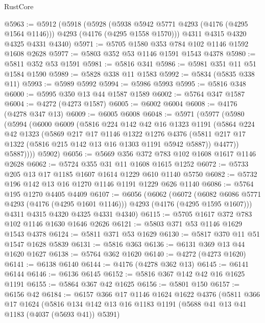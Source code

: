 \begin{lexlean}{RustCore}
\begin{coremodule}
@5963 := @5912
    (@5918
      (@5928
        (@5938 @5942 @5771 @4293 (@4176 (@4295 @1564 @1146)))
        @4293
        (@4176 (@4295 @1558 @1570)))
      @4311
      @4315
      @4320
      @4325
      @4331
      @4340)
@5971 := @5705 @1580 @353 @784 @102 @1146 @1592 @1608 @2628
@5977 := @5803 @352 @53 @1146 @1591 @1543 @4378
@5980 := @5811 @352 @53 @1591
@5981 := @5816 @341
@5986 := @5981 @351 @11 @51 @1584 @1590
@5989 := @5828 @338 @11 @1583
@5992 := @5834 (@5835 @338 @11)
@5993 := @5989 @5992
@5994 := @5986 @5993
@5995 := @5816 @348
@6000 := @5995 @350 @13 @44 @1587 @1589
@6002 := @5764 @347 @1587
@6004 := @4272 (@4273 @1587)
@6005 := @6002 @6004
@6008 := @4176 (@4278 @347 @13)
@6009 := @6005 @6008
@6048 := @5971
    (@5977
      (@5980
        (@5994
          (@6000
            @6009
            (@5816
              @224
              @142
              @42
              @16
              @1323
              @1191
              (@5864
                @224
                @42
                @1323
                (@5869
                  @217
                  @17
                  @1146
                  @1322
                  @1276
                  @4376
                  (@5811 @217 @17 @1322 (@5816 @215 @142 @13 @16 @1303 @1191 @5942 @5887))
                  @4477))
              @5887))))
      @5902)
@6056 := @5669 @356 @372 @783 @102 @1608 @1617 @1146 @2628
@6062 := @5724 @355 @31 @11 @1608 @1615 @1252
@6072 := @5733 @205 @13 @17 @1185 @1607 @1614 @1229 @610 @1140 @5750
@6082 := @5732 @196 @142 @13 @16 @1270 @1146 @1191 @1229 @626 @1140
@6086 := @5764 @195 @1270 @4405 @4409
@6107 := @6056
    (@6062
      (@6072
        (@6082 @6086 @5771 @4293 (@4176 (@4295 @1601 @1146)))
        @4293
        (@4176 (@4295 @1595 @1607)))
      @4311
      @4315
      @4320
      @4325
      @4331
      @4340)
@6115 := @5705 @1617 @372 @783 @102 @1146 @1630 @1646 @2626
@6121 := @5803 @371 @53 @1146 @1629 @1543 @4378
@6124 := @5811 @371 @53 @1629
@6130 := @5817 @370 @11 @51 @1547 @1628 @5839
@6131 := @5816 @363
@6136 := @6131 @369 @13 @44 @1620 @1627
@6138 := @5764 @362 @1620
@6140 := @4272 (@4273 @1620)
@6141 := @6138 @6140
@6144 := @4176 (@4278 @362 @13)
@6145 := @6141 @6144
@6146 := @6136 @6145
@6152 := @5816 @367 @142 @42 @16 @1625 @1191
@6155 := @5864 @367 @42 @1625
@6156 := @5801 @150
@6157 := @6156 @42
@6184 := @6157
    @366
    @17
    @1146
    @1624
    @1622
    @4376
    (@5811
      @366
      @17
      @1624
      (@5816
        @134
        @142
        @13
        @16
        @1183
        @1191
        (@5688 @41 @13 @41 @1183 (@4037 (@5693 @41)) @5391)

\end{coremodule}
\end{lexlean}
